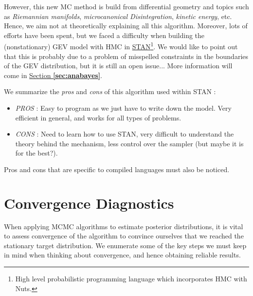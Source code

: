 However, this new MC method is build from differential geometry and topics such as \emph{Riemannian manifolds}, \emph{microcanonical Disintegration},\emph{ kinetic energy}, etc. Hence, we aim not at theoretically explaining all this algorithm. Moreover, lots of efforts have been spent, but we faced a difficulty when building the (nonstationary) GEV model with HMC in \href{http://mc-stan.org/}{STAN}\footnote{High level probabilistic programming language which incorporates HMC with Nuts.}. We would like to point out that this is probably due to a problem of misspelled constraints in the boundaries of the GEV distribution, but it is still an open issue... More information will come in \hyperref[sec:anabayes]{Section \textbf{\ref{sec:anabayes}}}.

We summarize the \emph{pros} and \emph{cons} of this algorithm used within STAN : 
\begin{itemize}
	\item \emph{PROS} : Easy to program as we just have to write down the model. Very efficient in general, and works for all types of problems.
	\item \emph{CONS} : Need to learn how to use STAN, very difficult to understand the theory behind the mechanism, less control over the sampler (but maybe it is for the best?).
\end{itemize}
Pros and cons that are specific to compiled languages must also be noticed.


\section{Convergence Diagnostics}\label{sec:convbay}

When applying MCMC algorithms to estimate posterior distributions, it is vital to assess convergence of the algorithm to convince ourselves that we reached the stationary target distribution. We enumerate some of the key steps we must keep in mind when thinking about convergence, and hence obtaining reliable results.

